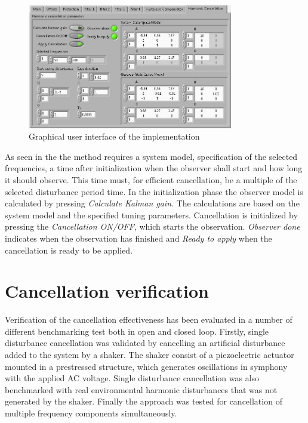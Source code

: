 \begin{figure}[h]
  \centering %
  \includegraphics[width=0.8\textwidth]{fig/HC_gui}
  \caption{\label{fig:gui}Graphical user interface of the \abbrRFDC implementation}
\end{figure}

As seen in the \abbrGUI the method requires a system model, specification of the selected frequencies, a time after initialization when the observer shall start and how long it should observe. This time must, for efficient cancellation, be a multiple of the selected disturbance period time. In the initialization phase the observer model is calculated by pressing \emph{Calculate Kalman gain}. The calculations are based on the system model and the specified tuning parameters. Cancellation is initialized by pressing the \emph{Cancellation ON/OFF}, which starts the observation. \emph{Observer done} indicates when the observation has finished and \emph{Ready to apply} when the cancellation is ready to be applied.

\section{Cancellation verification}
Verification of the cancellation effectiveness has been evaluated in a number of different benchmarking test both in open and closed loop. Firstly, single disturbance cancellation was validated by cancelling an artificial disturbance added to the system by a shaker. The shaker consist of a piezoelectric actuator mounted in a prestressed structure, which generates oscillations in symphony with the applied AC voltage. Single disturbance cancellation was also benchmarked with real environmental harmonic disturbances that was not generated by the shaker. Finally the approach was tested for cancellation of multiple frequency components simultaneously.

